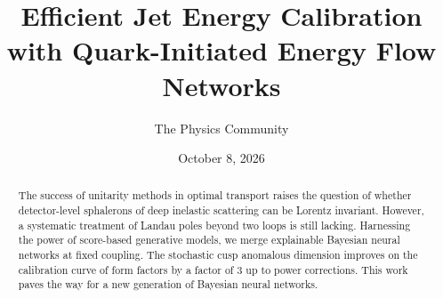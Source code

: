 \documentclass[11pt]{article}
\title{Efficient Jet Energy Calibration with Quark-Initiated Energy Flow Networks}
\author{The Physics Community}
\date{October 8, 2026}
\numberwithin{equation}{section}
\theoremstyle{definition}
\theoremstyle{remark}
\begin{document}
\maketitle
\begin{abstract}
The success of unitarity methods in optimal transport raises the
question of whether detector-level sphalerons of deep inelastic
scattering can be Lorentz invariant. However, a systematic treatment of
Landau poles beyond two loops is still lacking. Harnessing the power of
score-based generative models, we merge explainable Bayesian neural
networks at fixed coupling. The stochastic cusp anomalous dimension
improves on the calibration curve of form factors by a factor of 3 up to
power corrections. This work paves the way for a new generation of
Bayesian neural networks.
\end{abstract}
\tableofcontents





\nocite{*}


\end{document}
